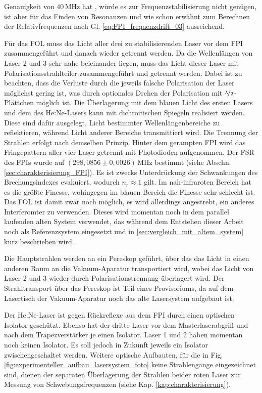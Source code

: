 Genauigkeit von $40\,$MHz hat
\cite{wavemeter_hardware_guide}, würde es zur Frequenzstabilisierung nicht genügen, ist aber für das Finden von Resonanzen und wie schon erwähnt zum Berechnen der Relativfrequenzen nach Gl. \eqref{eq:FPI_frequenzdrift_03}
ausreichend.\par
Für das FOL muss das Licht aller drei zu stabilisierenden
Laser vor dem FPI zusammengeführt und danach wieder getrennt werden. Da die
Wellenlängen von Laser 2 und 3 sehr nahe beieinander liegen, muss das Licht
dieser Laser mit Polarisationsstrahlteiler zusammengeführt und getrennt werden.
Dabei ist zu beachten, dass die Verluste durch die jeweils falsche Polarisation
der Laser möglichst gering ist, was durch optionales Drehen der
Polarisation mit $\nicefrac{\lambda}{2}$-Plättchen möglich ist. Die Überlagerung
mit dem blauen Licht des ersten Lasers und dem des He:Ne-Lasers kann mit
dichroitischen Spiegeln realisiert werden. Diese sind dafür ausgelegt, Licht
bestimmter Wellenlängenbereiche zu reflektieren, während Licht anderer  Bereiche
transmittiert wird. Die Trennung der Strahlen erfolgt nach demselben Prinzip.
Hinter dem gerampten FPI wird das Fringepattern aller vier Laser getrennt mit
Photodioden aufgenommen. Der FSR des FPIs wurde auf $(298,0856\pm0,0026)\,$MHz
bestimmt (siehe Abschn. \ref{sec:charakterisierung_FPI}).
Es ist zwecks Unterdrückung der Schwankungen des Brechungsindexes evakuiert,
wodurch $n_r\approx1$ gilt. Im nah-infraroten Bereich hat es die größte Finesse, wohingegen im blauen Bereich
die Finesse sehr schlecht ist. Das FOL ist damit zwar noch
möglich, es wird allerdings angestrebt, ein anderes Interferomter zu verwenden.
Dieses wird momentan noch in dem parallel laufenden alten System verwendet, das
während dem Entstehen dieser Arbeit noch als Referenzsystem eingesetzt und in
\ref{sec:vergleich_mit_altem_system} kurz beschrieben wird.\par
Die Hauptstrahlen werden an ein Pereskop geführt, über das das Licht in einen
anderen Raum an die Vakuum-Aparatur transportiert wird, wobei das Licht von
Laser 2 und 3 wieder durch Polarisationstrennung überlagert wird. Der
Strahltransport über das Pereskop ist Teil eines Provisoriums, da auf dem
Lasertisch der Vakuum-Aparatur noch das alte Lasersystem aufgebaut ist.\par
Der He:Ne-Laser ist gegen Rückreflexe aus dem FPI durch einen optischen Isolator
geschützt. Ebenso hat der dritte Laser vor dem Masterlaserabgriff und nach dem
Trapezverstärker je einen Isolator. Laser 1 und 2 haben momentan noch keinen
Isolator. Es soll jedoch in Zukunft jeweils ein Isolator zwischengeschaltet
werden. Weitere optische Aufbauten, für die in Fig.
\ref{fig:experimenteller_aufbau_lasersystem_foto} keine Strahlengänge eingezeichnet
sind, dienen der separaten Überlagerung der Strahlen beider roten Laser zur
Messung von Schwebungsfrequenzen (siehe Kap. \ref{kap:charakterisierung}).

